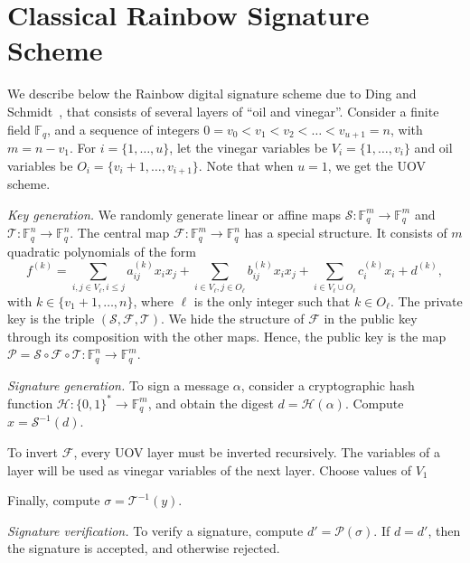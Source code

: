 \documentclass[a4paper, 14pt]{extarticle}
\begin{document}
\section{Classical Rainbow Signature Scheme}\label{sec:rainbow}

We describe below the Rainbow digital signature scheme due to Ding and Schmidt~\cite{Ding:inproc:2005:jun}, that consists of several layers of ``oil and vinegar''. Consider a finite field $\mathbb{F}_{q}$, and a sequence of integers $0 = v_{0} < v_{1} < v_{2} < \dots < v_{u+1} = n$, with $m = n - v_{1}$. For $i = \{1, \dots, u\}$, let the vinegar variables be $V_{i} = \{1, \dots, v_{i}\}$ and oil variables be $O_{i} = \{v_{i} + 1, \dots, v_{i+1}\}$. Note that when $u = 1$, we get the UOV scheme.

\emph{Key generation.} We randomly generate linear or affine maps $\mathcal{S}: \mathbb{F}_{q}^{m} \rightarrow \mathbb{F}_{q}^{m}$ and $\mathcal{T}: \mathbb{F}_{q}^{n} \rightarrow \mathbb{F}_{q}^{n}$. The central map $\mathcal{F}: \mathbb{F}_{q}^{m} \rightarrow \mathbb{F}_{q}^{n}$
has a special structure. It consists of $m$ quadratic polynomials of the form
$$f^{(k)} = \sum_{i, j \in V_{\ell}, i \leq j} a_{ij}^{(k)} x_{i} x_{j}
        + \sum_{i \in V_{\ell}, j \in O_{\ell}} b_{ij}^{(k)} x_{i} x_{j}
        + \sum_{i \in V_{\ell} \cup O_{\ell}} c_{i}^{(k)} x_{i} + d^{(k)},$$
with $k \in \{v_{1} + 1, \dots, n\}$, where $\ell$ is the only integer such that $k \in O_{\ell}$. The private key is the triple $(\mathcal{S}, \mathcal{F}, \mathcal{T})$. We hide the structure of $\mathcal{F}$ in the public key through its composition with the other maps. Hence, the public key is the map $\mathcal{P} = \mathcal{S} \circ \mathcal{F} \circ \mathcal{T} : \mathbb{F}_{q}^{n} \rightarrow \mathbb{F}_{q}^{m}$.

\emph{Signature generation.} To sign a message $\alpha$, consider a cryptographic hash function $\mathcal{H} : \{0, 1\}^{*} \rightarrow \mathbb{F}_{q}^{m}$, and obtain the digest $d = \mathcal{H}(\alpha)$. Compute $x = \mathcal{S}^{-1}(d)$. 


To invert $\mathcal{F}$, every UOV layer must be inverted recursively. The variables of a layer will be used as vinegar variables of the next layer. Choose values of $V_{1}$

Finally, compute $\sigma = \mathcal{T}^{-1}(y)$.

\emph{Signature verification.} To verify a signature, compute $d' = \mathcal{P}(\sigma)$. If $d = d'$, then the signature is accepted, and otherwise rejected.
\end{document}
